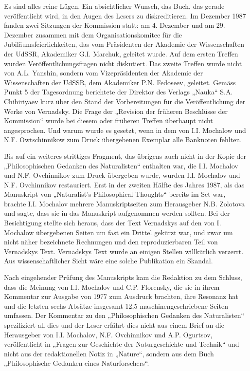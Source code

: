 \documentclass[11pt,a4paper]{article}
\begin{document}
Es sind alles reine Lügen. Ein absichtlicher Wunsch, das Buch, das gerade
veröffentlicht wird, in den Augen des Lesers zu diskreditieren. Im Dezember
1987 fanden zwei Sitzungen der Kommission statt: am 4. Dezember und am
29. Dezember zusammen mit dem Organisationskomitee für die
Jubiläumsfeierlichkeiten, das vom Präsidenten der Akademie der Wissenschaften
der UdSSR, Akademiker G.I. Marchuk, geleitet wurde. Auf dem ersten Treffen
wurden Veröffentlichungsfragen nicht diskutiert. Das zweite Treffen wurde
nicht von A.L. Yanshin, sondern vom Vizepräsidenten der Akademie der
Wissenschaften der UdSSR, dem Akademiker P.N. Fedoseev, geleitet. Gemäss Punkt
5 der Tagesordnung berichtete der Direktor des Verlags „Nauka“
S.A. Chibiriyaev kurz über den Stand der Vorbereitungen für die
Veröffentlichung der Werke von Vernadsky. Die Frage der „Revision der früheren
Beschlüsse der Kommission“ wurde bei diesem oder früheren Treffen überhaupt
nicht angesprochen. Und warum wurde es gesetzt, wenn in dem von I.I. Mochalow
und N.F. Owtschinnikow zum Druck übergebenen Exemplar alle Banknoten fehlten.

Bis auf ein weiteres strittiges Fragment, das übrigens auch nicht in der Kopie
der „Philosophischen Gedanken des Naturalisten“ enthalten war, die
I.I. Mochalov und N.F. Ovchinnikov zum Druck übergeben wurde, wurden
I.I. Mochalov und N.F. Ovchinnikov restauriert. Erst in der zweiten Hälfte des
Jahres 1987, als das Manuskript von „Naturalist's Philosophical Thoughts“
bereits im Set war, brachte I.I. Mochalov mehrere Manuskriptseiten zum
Herausgeber N.B. Zolotova und sagte, dass sie in das Manuskript aufgenommen
werden sollten. Bei der Besichtigung stellte sich heraus, dass der Text
Vernadskys auf den von I. Mochalow übergebenen Seiten um fast ein Drittel
gekürzt war, und zwar um nicht näher bezeichnete Rechnungen und den
reproduzierbaren Teil von Vernadskys Text. Vernadskys Text wurde an einigen
Stellen willkürlich verzerrt. Aus wissenschaftlicher Sicht wäre eine solche
Publikation ein Skandal.

Nach eingehender Prüfung des Manuskripts kam die Redaktion zu dem Schluss,
dass die Meinung von I.I. Mochalov und C.P. Florensky, die sie in ihrem
Kommentar zur Ausgabe von 1977 zum Ausdruck brachten, ihre Resonanz hat und
die letzten sechs Absätze insgesamt 12,5 maschinengeschriebene Seiten
umfassen. Der Kommentar zu den „Philosophischen Gedanken des Naturalisten“
spezifiziert all dies und der Leser erfährt dies nicht aus einem Brief an die
Herausgeber von I.I. Mochalov, N.F. Ovchinnikov und A.P. Ogurtsov,
veröffentlicht in „Fragen zur Geschichte der Naturgeschichte und Technik“ und
nicht aus der redaktionellen Notiz in „Nature“, sondern aus dem Buch
„Philosophische Gedanken eines Naturforschers“.
\end{document}
